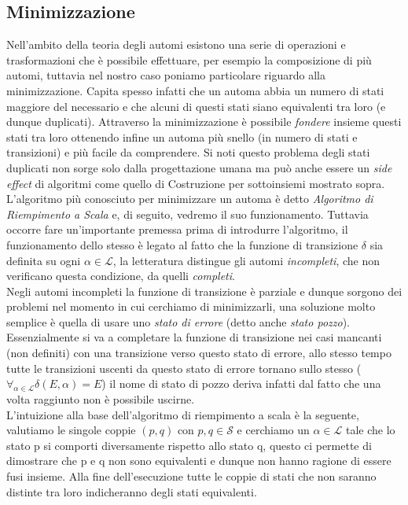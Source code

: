 \subsection{Minimizzazione}
Nell'ambito della teoria degli automi esistono una serie di operazioni e trasformazioni che è possibile effettuare, per esempio la composizione di più automi, tuttavia nel nostro caso poniamo particolare riguardo alla minimizzazione. Capita spesso infatti che un automa abbia un numero di stati maggiore del necessario e che alcuni di questi stati siano equivalenti tra loro (e dunque duplicati). Attraverso la minimizzazione è possibile \emph{fondere} insieme questi stati tra loro ottenendo infine un automa più snello (in numero di stati e transizioni) e più facile da comprendere. Si noti questo problema degli stati duplicati non sorge solo dalla progettazione umana ma può anche essere un \emph{side effect} di algoritmi come quello di Costruzione per sottoinsiemi mostrato sopra.\\
L'algoritmo più conosciuto per minimizzare un automa è detto \emph{Algoritmo di Riempimento a Scala}\cite{Linguaggi_di_Prorgammazione} e, di seguito, vedremo il suo funzionamento. Tuttavia occorre fare un'importante premessa prima di introdurre l'algoritmo, il funzionamento dello stesso è legato al fatto che la funzione di transizione $\delta$ sia definita su ogni $\alpha \in \mathcal{L}$, la letteratura distingue gli automi \emph{incompleti}, che non verificano questa condizione, da quelli \emph{completi}.\\
Negli automi incompleti la funzione di transizione è parziale e dunque sorgono dei problemi nel momento in cui cerchiamo di minimizzarli, una soluzione molto semplice è quella di usare uno \emph{stato di errore} (detto anche \emph{stato pozzo}). Essenzialmente si va a completare la funzione di transizione nei casi mancanti (non definiti) con una transizione verso questo stato di errore, allo stesso tempo tutte le transizioni uscenti da questo stato di errore tornano sullo stesso ($\forall_{ \alpha \in \mathcal{L}} \delta(E, \alpha) = E$) il nome di stato di pozzo deriva infatti dal fatto che una volta raggiunto non è possibile uscirne.\\
L'intuizione alla base dell'algoritmo di riempimento a scala è la seguente, valutiamo le singole coppie $(p, q)$ con $p, q \in \mathcal{S}$ e cerchiamo un $\alpha \in \mathcal{L}$ tale che lo stato p si comporti diversamente rispetto allo stato q, questo ci permette di dimostrare che p e q non sono equivalenti e dunque non hanno ragione di essere fusi insieme. Alla fine dell'esecuzione tutte le coppie di stati che non saranno distinte tra loro indicheranno degli stati equivalenti.\\
